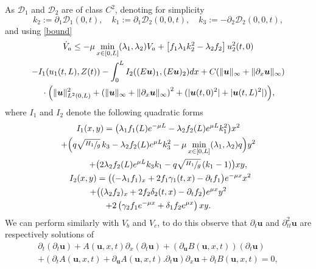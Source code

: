 \documentclass[JEP,XML,SOM,Unicode]{cedram}
\let\mathcal\mathscr
\theoremstyle{definition}
\begin{document}
As $\mathcal{D}_{1}$ and $\mathcal{D}_{2}$ are of class $C^{2}$,
denoting for simplicity
\[
k_{2}:=\partial_{1} \mathcal{D}_{1}(0,t),\quad k_{1}:=\partial_{1}\mathcal{D}_{2}(0,0,t),\quad
k_{3}:=-\partial_{2}\mathcal{D}_{2}(0,0,t),
\]
and using \eqref{bound}
\begin{multline*}
\dot V_{a}\leq
-\mu\min\limits_{x\in[0,L]}(\lambda_{1},\lambda_{2})V_{a}+\left[f_{1}\lambda_{1}k_{2}^{2}-\lambda_{2}f_{2}\right]u_{2}^{2}(t,0)\\
-I_{1}(u_{1}(t,L),Z(t))
-\int_{0}^{L}I_{2}((E\boldsymbol{u})_{1},(E\boldsymbol{u})_{2})dx+C(\lVert \boldsymbol{u}\rVert_{\infty}+\lVert \partial_{x} \boldsymbol{u}\rVert_{\infty})\\{}\cdot\Bigl(\lVert\boldsymbol{u} \rVert_{L^{2}(0,L)}^{2}+\left(\lVert \boldsymbol{u}\rVert_{\infty}+\lVert \partial_{x} \boldsymbol{u}\rVert_{\infty}\right)^{2}+(|\boldsymbol{u}(t,0)^{2}|+|\boldsymbol{u}(t,L)^{2}|)\Bigr),
\end{multline*}
where $I_{1}$ and $I_{2}$ denote the following quadratic forms
\begin{multline*}
I_{1}(x,y)=\bigl(\lambda_{1}f_{1}(L)e^{-\mu L}-\lambda_{2}f_{2}(L)e^{\mu L}k_{1}^{2}\bigr)x^{2}\\
+{\Bigl(q\sqrt{\sfrac{H_{1}}{g}}\,k_{3}-\lambda_{2}f_{2}(L)e^{\mu L}k_{3}^{2}-\mu\min\limits_{x\in[0,L]}(\lambda_{1},\lambda_{2})q\Bigr)}y^{2}\\
\shoveright{+\bigl(2\lambda_{2}f_{2}(L)e^{\mu L}k_{3}k_{1}-{q\sqrt{\sfrac{H_{1}}{g}}}\,(k_{1}-1)\bigr)xy,}\\
\shoveleft{I_{2}(x,y)=\bigl((-\lambda_{1}f_{1})_{x}+2f_{1}\gamma_{1}(t,x)-\partial_{t}f_{1}\bigr)e^{-\mu x}x^{2}}\\
+\bigl((\lambda_{2}f_{2})_{x}+2f_{2}\delta_{2}(t,x)-\partial_{t}f_{2}\bigr)e^{\mu x}y^{2}\\
+2\left(\gamma_{2}f_{1}e^{-\mu x}+\delta_{1}f_{2}e^{\mu x}\right)xy.
\end{multline*}
We can perform similarly with $V_{b}$ and $V_{c}$, to do this observe that $\partial_{t}\boldsymbol{u}$ and $\partial_{tt}^{2}\boldsymbol{u}$ are respectively solutions of
\begin{multline}
\label{V2}
\partial_{t}(\partial_{t}\boldsymbol{u})+A(\boldsymbol{u},x,t)\partial_{x}(\partial_{t}\boldsymbol{u})+(\partial_{\boldsymbol{u}}B(\boldsymbol{u},x,t))(\partial_{t}\boldsymbol{u})
\\
+(\partial_{t}A(\boldsymbol{u},x,t)+\partial_{\boldsymbol{u}}A(\boldsymbol{u},x,t).\partial_{t}\boldsymbol{u})\partial_{x}\boldsymbol{u}
+\partial_{t}B\left(\boldsymbol{u},x,t\right)=0,
\end{multline}
\end{document}
